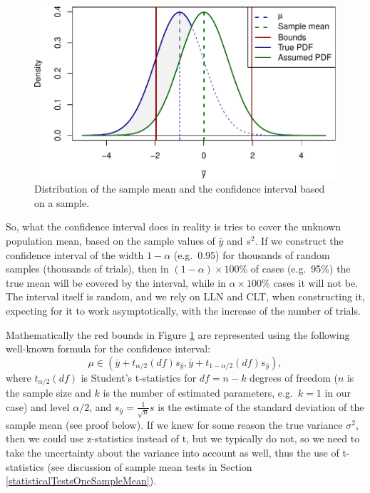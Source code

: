 \documentclass[
]{book}
\theoremstyle{definition}
\theoremstyle{definition}
\theoremstyle{definition}
\theoremstyle{definition}
\theoremstyle{remark}
\begin{document}
\begin{figure}
\centering
\includegraphics{Svetunkov---Statistics-for-Business-Analytics_files/figure-latex/normalCurveIntervalsShades-1.pdf}
\caption{\label{fig:normalCurveIntervalsShades}Distribution of the sample mean and the confidence interval based on a sample.}
\end{figure}

So, what the confidence interval does in reality is tries to cover the unknown population mean, based on the sample values of \(\bar{y}\) and \(s^2\). If we construct the confidence interval of the width \(1-\alpha\) (e.g.~0.95) for thousands of random samples (thousands of trials), then in \((1-\alpha)\times 100\)\% of cases (e.g.~95\%) the true mean will be covered by the interval, while in \(\alpha \times 100\)\% cases it will not be. The interval itself is random, and we rely on LLN and CLT, when constructing it, expecting for it to work asymptotically, with the increase of the number of trials.

Mathematically the red bounds in Figure \ref{fig:normalCurveIntervalsShades} are represented using the following well-known formula for the confidence interval:
\begin{equation}
    \mu \in (\bar{y} + t_{\alpha/2}(df) s_{\bar{y}}, \bar{y} + t_{1-\alpha/2}(df) s_{\bar{y}}),
    \label{eq:confidenceInterval}
\end{equation}
where \(t_{\alpha/2}(df)\) is Student's t-statistics for \(df=n-k\) degrees of freedom (\(n\) is the sample size and \(k\) is the number of estimated parameters, e.g.~\(k=1\) in our case) and level \(\alpha/2\), and \(s_{\bar{y}}=\frac{1}{\sqrt{n}}s\) is the estimate of the standard deviation of the sample mean (see proof below). If we knew for some reason the true variance \(\sigma^2\), then we could use z-statistics instead of t, but we typically do not, so we need to take the uncertainty about the variance into account as well, thus the use of t-statistics (see discussion of sample mean tests in Section \ref{statisticalTestsOneSampleMean}).
\end{document}
